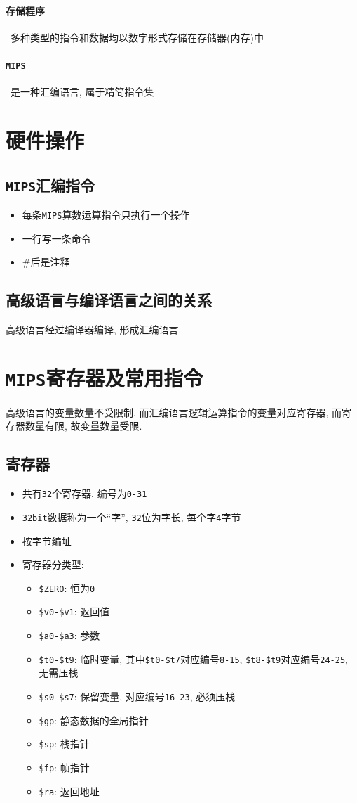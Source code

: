 \paragraph{存储程序}~{多种类型的指令和数据均以数字形式存储在存储器(内存)中}
\paragraph{\texttt{MIPS}}~{是一种汇编语言, 属于精简指令集}
\section{硬件操作}
\subsection{\texttt{MIPS}汇编指令}
\begin{itemize}
\item 每条\texttt{MIPS}算数运算指令只执行一个操作
\item 一行写一条命令
\item \#后是注释
\end{itemize}
\subsection{高级语言与编译语言之间的关系}
高级语言经过编译器编译, 形成汇编语言.
\section{\texttt{MIPS}寄存器及常用指令}
高级语言的变量数量不受限制, 而汇编语言逻辑运算指令的变量对应寄存器, 而寄存器数量有限, 故变量数量受限.
\subsection{寄存器}
\begin{itemize}
\item 共有\verb|32|个寄存器, 编号为\verb|0-31|
\item \verb|32bit|数据称为一个``字'', \verb|32|位为字长, 每个字\verb|4|字节
\item 按字节编址
\item 寄存器分类型:
\begin{itemize}
\item \verb|$ZERO|: 恒为\verb|0|
\item \verb|$v0-$v1|: 返回值
\item \verb|$a0-$a3|: 参数
\item \verb|$t0-$t9|: 临时变量, 其中\verb|$t0-$t7|对应编号\verb|8-15|, \verb|$t8-$t9|对应编号\verb|24-25|, 无需压栈
\item \verb|$s0-$s7|: 保留变量, 对应编号\verb|16-23|, 必须压栈
\item \verb|$gp|: 静态数据的全局指针
\item \verb|$sp|: 栈指针
\item \verb|$fp|: 帧指针
\item \verb|$ra|: 返回地址
\end{itemize}
\end{itemize}
